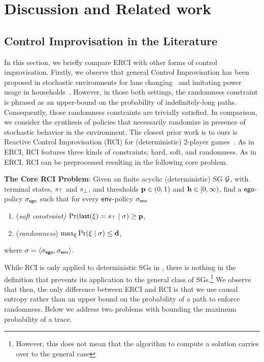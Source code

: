 \section{Discussion and Related work}\label{sec:related}

\subsection{Control Improvisation in the Literature}

In this section, we briefly compare ERCI with other forms of control
improvisation. Firstly, we observe that general Control Improvisation
has been proposed in stochastic environments for lane
changing~\cite{DBLP:conf/cdc/GeM18} and imitating power usage in
households~\cite{DBLP:conf/iotdi/AkkayaFVDLS16}. However, in those
both settings, the randomness constraint is phrased as an upper-bound
on the probability of indefinitely-long paths. Consequently, those
randomness constraints are trivially satisfied.  In comparison, we consider the synthesis
of policies that necessarily randomize in presence of stochastic
behavior in the environment. The closest prior work is to ours
is Reactive Control Improvisation (RCI) for (deterministic) 2-player games~\cite{DBLP:conf/cav/FremontS18}. As in ERCI, RCI features
 three kinds of constraints; hard, soft, and randomness. As in ERCI,
RCI can be preprocessed resulting in the following core problem.
\begin{mdframed}[nobreak=true]
  \textbf{The Core RCI Problem}: Given an finite acyclic
  (deterministic) SG $\mathcal{G}$, with terminal states, $s_{\top}$ and $s_{\bot}$,
  and thresholds $\mathbf{p} \in (0,1)$ and
  $\mathbf{h} \in [0,\infty)$, find a $\mathsf{ego}$-policy ${\sigma_{\mathsf{ego}}}$
  such that for every $\mathsf{env}$-policy ${\sigma_{\mathsf{env}}}$
  \begin{enumerate}
  \item (\emph{soft constraint)}
    $\Pr(\mathsf{last}({\xi}) = s_{\top} \mid \sigma) \geq \mathbf{p}$,
  \item (\emph{randomness})
    $\max_\xi{\Pr(\xi\mid \sigma)} \leq \mathbf{d}$,
   \end{enumerate}
   where $\sigma = \langle {\sigma_{\mathsf{ego}}}, {\sigma_{\mathsf{env}}} \rangle$.
 \end{mdframed}
 While RCI is only applied to deterministic SGs in
 \cite{DBLP:conf/cav/FremontS18}, there is nothing in the definition
 that prevents its application to the general class of
 SGs.\footnote{However, this does not mean that the algorithm to
   compute a solution carries over to the general case} We observe
 that then, the only difference between ERCI and RCI is that we use
 causal entropy rather than an upper bound on the probability of a
 path to enforce randomness.  Below we address two problems with
 bounding the maximum probability of a trace.

